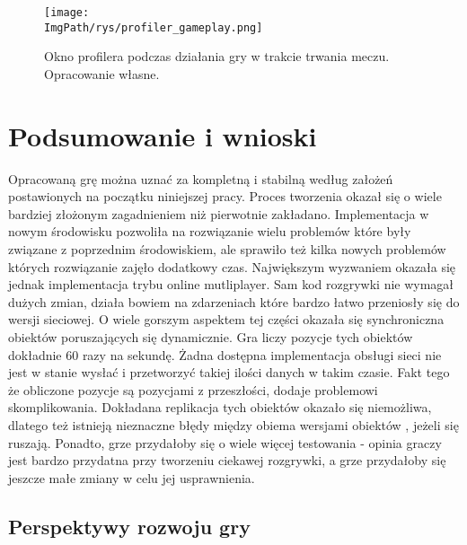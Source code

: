 \documentclass[a4paper,12pt,twoside,openany]{report}
\newcommand{\ImgPath}{.}
\begin{document}
\begin{figure}[H]
	\begin{center}
\centering
\texttt{[image: \\ImgPath/rys/profiler\_gameplay.png]}
\end{center}
	\caption{Okno profilera podczas działania gry w trakcie trwania meczu. Opracowanie własne.}
	\label{profiler_gameplay}
\end{figure}

\chapter{Podsumowanie i wnioski }
Opracowaną grę można uznać za kompletną i stabilną według założeń postawionych na początku niniejszej pracy. Proces tworzenia okazał się o wiele bardziej złożonym zagadnieniem niż pierwotnie zakładano. Implementacja w nowym środowisku pozwoliła na rozwiązanie wielu problemów które były związane z poprzednim środowiskiem, ale sprawiło też kilka nowych problemów których rozwiązanie zajęło dodatkowy czas. Największym wyzwaniem okazała się jednak implementacja trybu online mutliplayer. Sam kod rozgrywki nie wymagał dużych zmian, działa bowiem na zdarzeniach które bardzo łatwo przeniosły się do wersji sieciowej. O wiele gorszym aspektem tej części okazała się synchroniczna obiektów poruszających się dynamicznie. Gra liczy pozycje tych obiektów dokładnie 60 razy na sekundę. Żadna dostępna implementacja obsługi sieci nie jest w stanie wysłać i przetworzyć takiej ilości danych w takim czasie. Fakt tego że obliczone pozycje są pozycjami z przeszłości, dodaje problemowi skomplikowania. Dokładana replikacja tych obiektów okazało się niemożliwa, dlatego też istnieją nieznaczne błędy między obiema wersjami obiektów , jeżeli się ruszają. Ponadto, grze przydałoby się o wiele więcej testowania - opinia graczy jest bardzo przydatna przy tworzeniu ciekawej rozgrywki, a grze przydałoby się jeszcze małe zmiany w celu jej usprawnienia.

\section{Perspektywy rozwoju gry}
\end{document}

